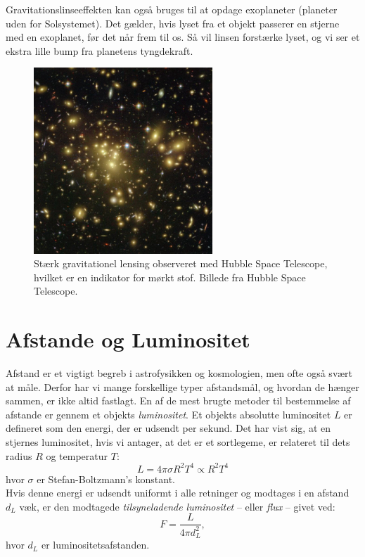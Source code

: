 Gravitationslinseeffekten kan også bruges til at opdage exoplaneter (planeter uden for Solsystemet). Det gælder, hvis lyset fra et objekt passerer en stjerne med en exoplanet, før det når frem til os. Så vil linsen forstærke lyset, og vi ser et ekstra lille bump fra planetens tyngdekraft.

\begin{figure}[h!]
	\centering
	\includegraphics[width=0.6\textwidth]{Kosmo/2017/img/abell1689.jpg}
	\caption{Stærk gravitationel lensing observeret med Hubble Space Telescope, hvilket er en indikator for mørkt stof. Billede fra Hubble Space Telescope.}
	\label{abell1689}
\end{figure}
\fi

\section{Afstande og Luminositet}
Afstand er et vigtigt begreb i astrofysikken og kosmologien, men ofte også svært at måle. Derfor har vi mange forskellige typer afstandsmål, og hvordan de hænger sammen, er ikke altid fastlagt. En af de mest brugte metoder til bestemmelse af afstande er gennem et objekts \textit{luminositet}. Et objekts absolutte luminositet $L$ er defineret som den energi, der er udsendt per sekund. Det har vist sig, at en stjernes luminositet, hvis vi antager, at det er et sortlegeme, er relateret til dets radius $R$ og temperatur $T$:
\begin{equation}
L = 4\pi\sigma R^2T^4 \propto R^2 T^4
\end{equation}
hvor $\sigma$ er Stefan-Boltzmann's konstant. \\
Hvis denne energi er udsendt uniformt i alle retninger og modtages i en afstand $d_L$ væk, er den modtagede \textit{tilsyneladende luminositet} -- eller \emph{flux} -- givet ved:
\begin{equation} \label{eq:L}
F = \frac{L}{4\pi d_L^2},
\end{equation}
hvor $d_L$ er luminositetsafstanden. 

